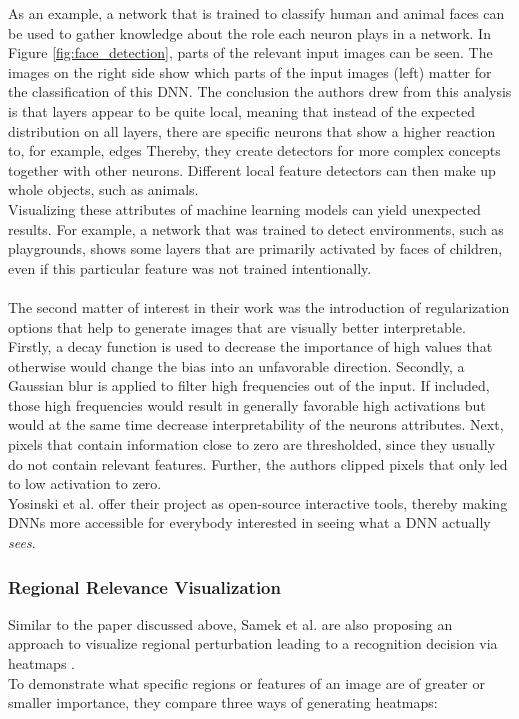 \documentclass{acmsiggraph}               %
\begin{document}
As an example, a network that is trained to classify human and animal faces can be used to gather knowledge about the role each neuron plays in a network. In Figure \ref{fig:face_detection}, parts of the relevant input images can be seen. The images on the right side show which parts of the input images (left) matter for the classification of this DNN. The conclusion the authors drew from this analysis is that layers appear to be quite local, meaning that instead of the expected distribution on all layers, there are specific neurons that show a higher reaction to, for example, edges Thereby, they create detectors for more complex concepts together with other neurons. Different local feature detectors can then make up whole objects, such as animals. \\
Visualizing these attributes of machine learning models can yield unexpected results. For example, a network that was trained to detect environments, such as playgrounds, shows some layers that are primarily activated by faces of children, even if this particular feature was not trained intentionally.\\\\
The second matter of interest in their work was the introduction of regularization options that help to generate images that are visually better interpretable.\\
Firstly, a decay function is used to decrease the importance of high values that otherwise would change the bias into an unfavorable direction. Secondly, a Gaussian blur is applied to filter high frequencies out of the input. If included, those high frequencies would result in generally favorable high activations but would at the same time decrease interpretability of the neurons attributes. Next, pixels that contain information close to zero are thresholded, since they usually do not contain relevant features. Further, the authors clipped pixels that only led to low activation to zero.\\
Yosinski et al. offer their project as open-source interactive tools, thereby making DNNs more accessible for everybody interested in seeing what a DNN actually \textit{sees}.

\subsubsection{Regional Relevance Visualization}
Similar to the paper discussed above, Samek et al. are also proposing an approach to visualize regional perturbation leading to a recognition decision via heatmaps \cite{Samek2017}. \\
To demonstrate what specific regions or features of an image are of greater or smaller importance, they compare three ways of generating heatmaps:
\end{document}
